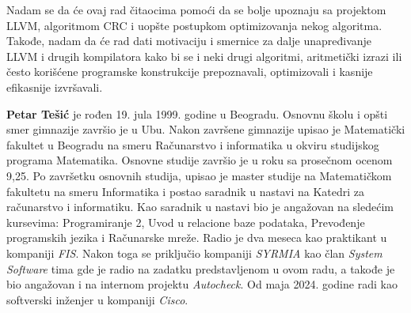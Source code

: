 \documentclass[12pt,oneside]{memoir}
\begin{document}
Nadam se da će ovaj rad čitaocima pomoći da se bolje upoznaju sa projektom LLVM, algoritmom CRC i uopšte postupkom optimizovanja nekog algoritma. Takođe, nadam da će rad dati motivaciju i smernice za dalje unapređivanje LLVM i drugih kompilatora kako bi se i neki drugi algoritmi, aritmetički izrazi ili često korišćene programske konstrukcije prepoznavali, optimizovali i kasnije efikasnije izvršavali.


\literatura

\backmatter

\begin{biografija}
\textbf{Petar Tešić}  je rođen 19. jula 1999. godine u Beogradu. Osnovnu školu i opšti smer 
gimnazije završio je u Ubu. Nakon završene gimnazije upisao je Matematički fakultet u Beogradu 
na smeru Računarstvo i informatika u okviru studijskog programa Matematika. Osnovne studije 
završio je u roku sa prosečnom ocenom 9,25. Po završetku osnovnih studija, upisao je master 
studije na Matematičkom fakultetu na smeru Informatika i postao saradnik u nastavi na Katedri za 
računarstvo i informatiku. Kao saradnik u nastavi bio je angažovan na sledećim kursevima: 
Programiranje 2, Uvod u relacione baze podataka, Prevođenje programskih jezika i Računarske 
mreže. Radio je dva meseca kao praktikant u kompaniji \textit{FIS}. Nakon toga se priključio kompaniji 
\textit{SYRMIA} kao član \textit{System Software} tima gde je radio na zadatku predstavljenom u ovom radu, a 
takođe je bio angažovan i na internom projektu \textit{Autocheck}. Od maja 2024. godine radi kao 
softverski inženjer u kompaniji \textit{Cisco}.
\end{biografija}
\end{document}
